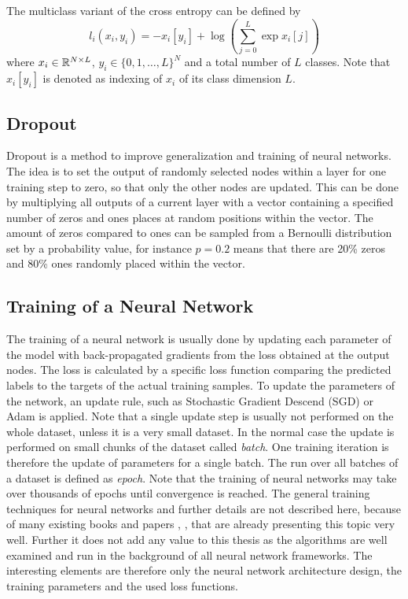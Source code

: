 The multiclass variant of the cross entropy can be defined by
\begin{equation}
  l_i(x_i, y_i) = - x_i[y_i] + \log{\left( \sum_{j=0}^{L} \exp{x_i[j]} \right)}
\end{equation}
where $x_i \in \mathbb{R}^{N \times L}$, $y_i \in \{0, 1, \dots, L\}^N$ and a total number of $L$ classes.
Note that $x_i[y_i]$ is denoted as indexing of $x_i$ of its class dimension $L$. 



\subsection{Dropout}
Dropout \cite{Hinton2012} is a method to improve generalization and training of neural networks.
The idea is to set the output of randomly selected nodes within a layer for one training step to zero, so that only the other nodes are updated.
This can be done by multiplying all outputs of a current layer with a vector containing a specified number of zeros and ones places at random positions within the vector.
The amount of zeros compared to ones can be sampled from a Bernoulli distribution set by a probability value, for instance $p=0.2$ means that there are 20\% zeros and 80\% ones randomly placed within the vector.



\subsection{Training of a Neural Network}
The training of a neural network is usually done by updating each parameter of the model with back-propagated gradients from the loss obtained at the output nodes.
The loss is calculated by a specific loss function comparing the predicted labels to the targets of the actual training samples.
To update the parameters of the network, an update rule, such as Stochastic Gradient Descend (SGD) or Adam \cite{Kingma2015} is applied.
Note that a single update step is usually not performed on the whole dataset, unless it is a very small dataset. 
In the normal case the update is performed on small chunks of the dataset called \emph{batch}.
One training iteration is therefore the update of parameters for a single batch.
The run over all batches of a dataset is defined as \emph{epoch}.
Note that the training of neural networks may take over thousands of epochs until convergence is reached.
The general training techniques for neural networks and further details are not described here, because of many existing books and papers \cite{LeCun2006}, \cite{Goodfellow2016}, \cite{DeepLearning} that are already presenting this topic very well. 
Further it does not add any value to this thesis as the algorithms are well examined and run in the background of all neural network frameworks.
The interesting elements are therefore only the neural network architecture design, the training parameters and the used loss functions.


